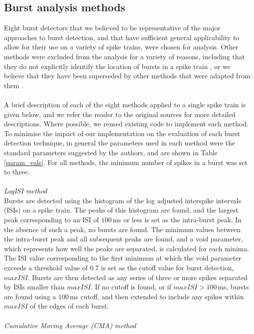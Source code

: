 \documentclass[12pt, titlepage]{article}
\begin{document}
	\subsection*{Burst analysis methods}
	Eight burst detectors that we believed to be representative of the major approaches to burst detection, and that have sufficient general applicability to allow for their use on a variety of spike trains, were chosen for analysis. Other methods were excluded from the analysis for a variety of reasons, including that they do not explicitly identify the location of bursts in a spike train \cite{VanElburg2004}, or we believe that they have been superseded by other methods that were adapted from them \cite{Selinger2007,Chiappalone2005}. 
	\\ \\ A brief description of each of the eight methods applied to a single spike train is given below, and we refer the reader to the original sources for more detailed descriptions. Where possible, we reused existing code to implement each method. To minimise the impact of our implementation on the evaluation of each burst detection technique, in general the parameters used in each method were the standard parameters suggested by the authors, and are shown in Table \ref{param_vals}.  For all methods, the minimum number of spikes in a burst was set to three. 
	\\ \\ \textit{LogISI method \cite{Pasquale2010}} 
	\\Bursts are detected using the histogram of the log adjusted interspike intervals (ISIs) on a spike train. The peaks of this histogram are found, and the largest peak corresponding to an ISI of $100\,$ms or less is set as the intra-burst peak. In the absence of such a peak, no bursts are found. The minimum values between the intra-burst peak and all subsequent peaks are found, and a void parameter, which represents how well the peaks are separated, is calculated for each minima. The ISI value corresponding to the first minimum at which the void parameter exceeds a threshold value of 0.7 is set as the cutoff value for burst detection, $maxISI$.  Bursts are then detected as any series of three or more spikes separated by ISIs smaller than $maxISI$. If no cutoff is found, or if $maxISI>100\,$ms, bursts are found using a $100\,$ms cutoff, and then extended to include any spikes within $maxISI$ of the edges of each burst.
	\\ \\ \textit{Cumulative Moving Average (CMA) method \cite{Kapucu2012}} 
\end{document}
